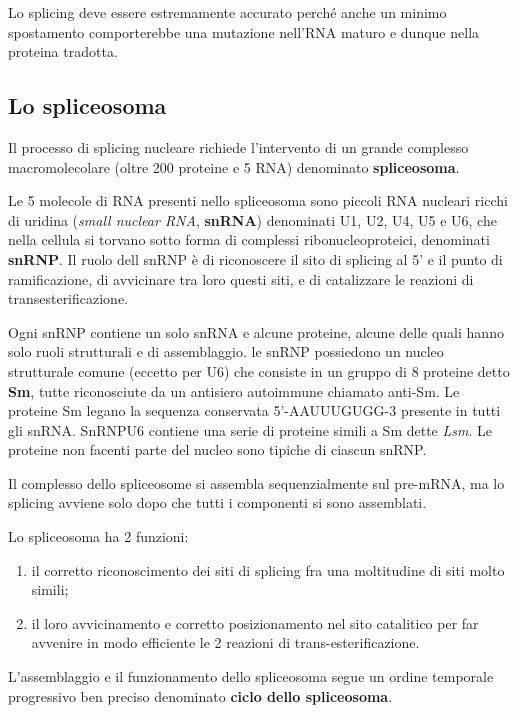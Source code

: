 \documentclass[11pt]{book}
\begin{document}
Lo splicing deve essere estremamente accurato perché anche un minimo
spostamento comporterebbe una mutazione nell'RNA maturo e dunque nella
proteina tradotta.

\subsection{Lo spliceosoma}\label{lo-spliceosoma}

Il processo di splicing nucleare richiede l'intervento di un grande
complesso macromolecolare (oltre 200 proteine e 5 RNA) denominato
\textbf{spliceosoma}.

Le 5 molecole di RNA presenti nello spliceosoma sono piccoli RNA
nucleari ricchi di uridina (\emph{small nuclear RNA}, \textbf{snRNA})
denominati U1, U2, U4, U5 e U6, che nella cellula si torvano sotto forma
di complessi ribonucleoproteici, denominati \textbf{snRNP}. Il ruolo
dell snRNP è di riconoscere il sito di splicing al 5' e il punto di
ramificazione, di avvicinare tra loro questi siti, e di catalizzare le
reazioni di transesterificazione.

Ogni snRNP contiene un solo snRNA e alcune proteine, alcune delle quali
hanno solo ruoli strutturali e di assemblaggio. le snRNP possiedono un
nucleo strutturale comune (eccetto per U6) che consiste in un gruppo di
8 proteine detto \textbf{Sm}, tutte riconosciute da un antisiero
autoimmune chiamato anti-Sm. Le proteine Sm legano la sequenza
conservata 5'-AAUUUGUGG-3 presente in tutti gli snRNA. SnRNPU6 contiene
una serie di proteine simili a Sm dette \emph{Lsm}. Le proteine non
facenti parte del nucleo sono tipiche di ciascun snRNP.

Il complesso dello spliceosome si assembla sequenzialmente sul pre-mRNA,
ma lo splicing avviene solo dopo che tutti i componenti si sono
assemblati.

Lo spliceosoma ha 2 funzioni:

\begin{enumerate}
\def\labelenumi{\arabic{enumi}.}
\itemsep1pt\parskip0pt
\item
  il corretto riconoscimento dei siti di splicing fra una moltitudine di
  siti molto simili;
\item
  il loro avvicinamento e corretto posizionamento nel sito catalitico
  per far avvenire in modo efficiente le 2 reazioni di
  trans-esterificazione.
\end{enumerate}

L'assemblaggio e il funzionamento dello spliceosoma segue un ordine
temporale progressivo ben preciso denominato \textbf{ciclo dello
spliceosoma}.
\end{document}
